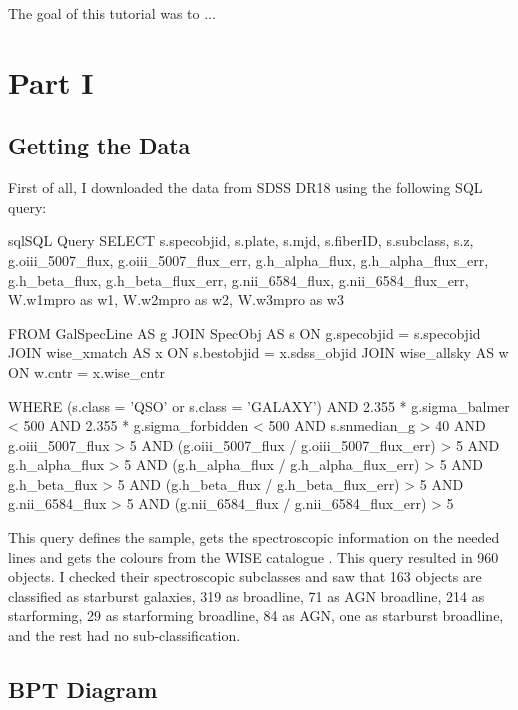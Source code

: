 \documentclass[letterpaper, oneside]{article}
\begin{document}
	
\templatePagecfg


The goal of this tutorial was to ...


\section{Part I}

\subsection{Getting the Data}

First of all, I downloaded the data from SDSS DR18 \cite{sdss_dr18} using the following SQL query:

\begin{sourcecode}[\label{sdss_query}]{sql}{SQL Query}
SELECT s.specobjid, s.plate, s.mjd, s.fiberID, s.subclass, s.z, 
g.oiii_5007_flux, g.oiii_5007_flux_err, 
g.h_alpha_flux, g.h_alpha_flux_err, 
g.h_beta_flux, g.h_beta_flux_err, 
g.nii_6584_flux, g.nii_6584_flux_err, 
W.w1mpro as w1, W.w2mpro as w2, W.w3mpro as w3

FROM GalSpecLine AS g 
JOIN SpecObj AS s ON g.specobjid = s.specobjid
JOIN wise_xmatch AS x ON s.bestobjid = x.sdss_objid
JOIN wise_allsky AS w ON w.cntr = x.wise_cntr

WHERE
(s.class = 'QSO' or s.class = 'GALAXY')
AND 2.355 * g.sigma_balmer < 500
AND 2.355 * g.sigma_forbidden < 500
AND s.snmedian_g > 40
AND g.oiii_5007_flux > 5
AND (g.oiii_5007_flux / g.oiii_5007_flux_err) > 5
AND g.h_alpha_flux > 5
AND (g.h_alpha_flux / g.h_alpha_flux_err) > 5
AND g.h_beta_flux > 5
AND (g.h_beta_flux / g.h_beta_flux_err) > 5
AND g.nii_6584_flux > 5
AND (g.nii_6584_flux / g.nii_6584_flux_err) > 5
\end{sourcecode}

This query defines the sample, gets the spectroscopic information on the needed lines and gets the colours from the WISE catalogue \cite{wise_allsky}. This query resulted in 960 objects. I checked their spectroscopic subclasses and saw that 163 objects are classified as starburst galaxies, 319 as broadline, 71 as AGN broadline, 214 as starforming, 29 as starforming broadline, 84 as AGN, one as starburst broadline, and the rest had no sub-classification.

\subsection{BPT Diagram}
\end{document}
